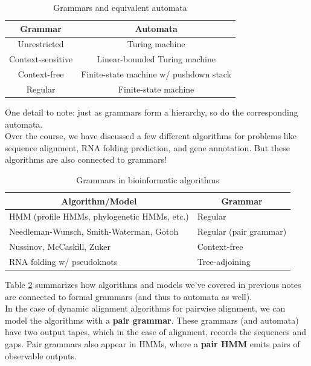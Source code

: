 \documentclass[12pt]{article}
\begin{document}
\begin{table}[h]
\centering
\caption{Grammars and equivalent automata}
\label{tab:automata}
\begin{tabular}{cc}
\textbf{Grammar}  & \textbf{Automata}                      \\ \hline
Unrestricted      & Turing machine                         \\
Context-sensitive & Linear-bounded Turing machine          \\
Context-free      & Finite-state machine w/ pushdown stack \\
Regular           & Finite-state machine                  
\end{tabular}
\end{table}

One detail to note: just as grammars form a hierarchy, so do the corresponding automata.\\[10pt]
Over the course, we have discussed a few different algorithms for problems like sequence alignment, RNA folding prediction, and gene annotation. But these algorithms are also connected to grammars! 
\begin{table}[h]
\centering
\caption{Grammars in bioinformatic algorithms}
\label{tab:connect}
\begin{tabular}{ll}
\multicolumn{1}{c}{\textbf{Algorithm/Model}} & \multicolumn{1}{c}{\textbf{Grammar}} \\ \hline
HMM (profile HMMs, phylogenetic HMMs, etc.)  & Regular                              \\
Needleman-Wunsch, Smith-Waterman, Gotoh      & Regular (pair grammar)               \\
Nussinov, McCaskill, Zuker                   & Context-free                         \\
RNA folding w/ pseudoknots                   & Tree-adjoining                      
\end{tabular}
\end{table}

Table \ref{tab:connect} summarizes how algorithms and models we've covered in previous notes are connected to formal grammars (and thus to automata as well).\\[10pt]
In the case of dynamic alignment algorithms for pairwise alignment, we can model the algorithms with a \textbf{pair grammar}. These grammars (and automata) have two output tapes, which in the case of alignment, records the sequences and gaps. Pair grammars also appear in HMMs, where a \textbf{pair HMM} emits pairs of observable outputs.
\end{document}
